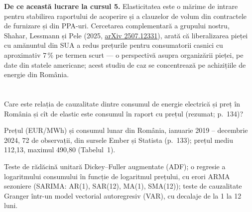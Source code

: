 {\small{}%
{\textbf{De ce această lucrare la cursul 5.} Elasticitatea este o mărime de intrare pentru stabilirea raportului de acoperire și a clauzelor de volum din contractele de furnizare și din PPA-uri. Cercetarea complementară a grupului nostru, Shahar, Lessmann și Pele (2025, \href{https://arxiv.org/abs/2507.12331}{arXiv 2507.12331}), arată că liberalizarea pieței cu amănuntul din SUA a redus prețurile pentru consumatorii casnici cu aproximativ 7\,\% pe termen scurt --- o perspectivă asupra organizării pieței, pe date din statele americane; acest studiu de caz se concentrează pe achizițiile de energie din România.}}

\section{}
\textbf{} %
{Care este relația de cauzalitate dintre consumul de energie electrică și preț în România și cît de elastic este consumul în raport cu prețul (rezumat; p.~134)?}

\textbf{} %
{Prețul (EUR/MWh) și consumul lunar din România, ianuarie 2019 -- decembrie 2024, 72 de observații, din sursele Ember și Statista (p.~133); prețul mediu 112,13, maximul 490,80 (Tabelul~1).}

\textbf{} %
{Teste de rădăcină unitară Dickey--Fuller augmentate (ADF); o regresie a logaritmului consumului în funcție de logaritmul prețului, cu erori ARMA sezoniere (SARIMA: AR(1), SAR(12), MA(1), SMA(12)); teste de cauzalitate Granger într-un model vectorial autoregresiv (VAR), cu decalaje de la 1 la 12 luni.}

